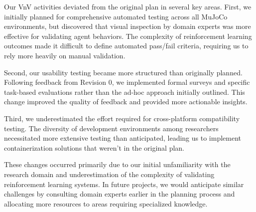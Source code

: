 \documentclass[12pt, titlepage]{article}
\begin{document}
\begin{enumerate}
  Our VnV activities deviated from the original plan in several key areas. First, we initially planned for comprehensive automated testing across all MuJoCo environments, but discovered that visual inspection by domain experts was more effective for validating agent behaviors. The complexity of reinforcement learning outcomes made it difficult to define automated pass/fail criteria, requiring us to rely more heavily on manual validation.

  Second, our usability testing became more structured than originally planned. Following feedback from Revision 0, we implemented formal surveys and specific task-based evaluations rather than the ad-hoc approach initially outlined. This change improved the quality of feedback and provided more actionable insights.

  Third, we underestimated the effort required for cross-platform compatibility testing. The diversity of development environments among researchers necessitated more extensive testing than anticipated, leading us to implement containerization solutions that weren't in the original plan.

  These changes occurred primarily due to our initial unfamiliarity with the research domain and underestimation of the complexity of validating reinforcement learning systems. In future projects, we would anticipate similar challenges by consulting domain experts earlier in the planning process and allocating more resources to areas requiring specialized knowledge.
\end{enumerate}
\end{document}
